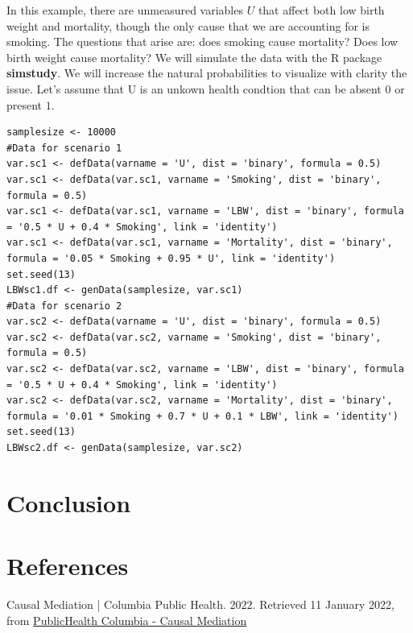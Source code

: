 \documentclass{article}
\begin{document}
In this example, there are unmeasured variables \(U\) that affect both low birth weight and mortality, though the only cause that we are accounting for is smoking. The questions that arise are: does smoking cause mortality? Does low birth weight cause mortality? We will simulate the data with the R package \textbf{simstudy}. We will increase the natural probabilities to visualize with clarity the issue. Let's assume that U is an unkown health condtion that can be absent \(0\) or present \(1\).
\begin{lstlisting}
samplesize <- 10000
#Data for scenario 1
var.sc1 <- defData(varname = 'U', dist = 'binary', formula = 0.5)
var.sc1 <- defData(var.sc1, varname = 'Smoking', dist = 'binary', formula = 0.5)
var.sc1 <- defData(var.sc1, varname = 'LBW', dist = 'binary', formula = '0.5 * U + 0.4 * Smoking', link = 'identity')
var.sc1 <- defData(var.sc1, varname = 'Mortality', dist = 'binary', formula = '0.05 * Smoking + 0.95 * U', link = 'identity')
set.seed(13)
LBWsc1.df <- genData(samplesize, var.sc1)
#Data for scenario 2
var.sc2 <- defData(varname = 'U', dist = 'binary', formula = 0.5)
var.sc2 <- defData(var.sc2, varname = 'Smoking', dist = 'binary', formula = 0.5)
var.sc2 <- defData(var.sc2, varname = 'LBW', dist = 'binary', formula = '0.5 * U + 0.4 * Smoking', link = 'identity')
var.sc2 <- defData(var.sc2, varname = 'Mortality', dist = 'binary', formula = '0.01 * Smoking + 0.7 * U + 0.1 * LBW', link = 'identity')
set.seed(13)
LBWsc2.df <- genData(samplesize, var.sc2)
\end{lstlisting}







\section{Conclusion}









\section{References}

Causal Mediation | Columbia Public Health. \(2022\). Retrieved 11 January 2022, from \href{https://www.publichealth.columbia.edu/research/population-health-methods/causal-mediation}{PublicHealth Columbia - Causal Mediation}
\end{document}
